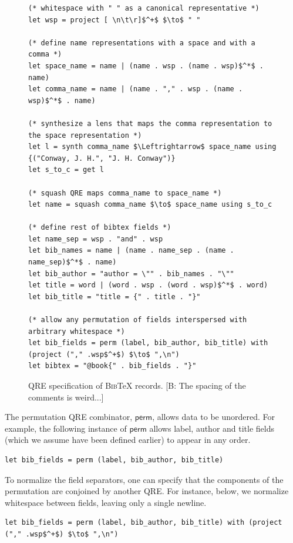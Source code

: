 \documentclass[acmsmall,review,anonymous]{acmart}
\newcommand{\FINISH}[3]{\ifdraft\textcolor{#1}{[#2: #3]}\fi}
\newcommand{\bcp}[1]{\FINISH{dkred}{B}{#1}}
\newcommand{\kw}[1]{\ensuremath{\mathsf{#1}}}
\newcommand{\bibtex}{\textsc{Bib}\TeX{}}
\begin{document}
\begin{figure}[t]
\begin{lstlisting}
(* whitespace with " " as a canonical representative *)
let wsp = project [ \n\t\r]$^+$ $\to$ " "

(* define name representations with a space and with a comma *)
let space_name = name | (name . wsp . (name . wsp)$^*$ . name)
let comma_name = name | (name . "," . wsp . (name . wsp)$^*$ . name)

(* synthesize a lens that maps the comma representation to the space representation *)
let l = synth comma_name $\Leftrightarrow$ space_name using {("Conway, J. H.", "J. H. Conway")}
let s_to_c = get l

(* squash QRE maps comma_name to space_name *)
let name = squash comma_name $\to$ space_name using s_to_c

(* define rest of bibtex fields *)
let name_sep = wsp . "and" . wsp
let bib_names = name | (name . name_sep . (name . name_sep)$^*$ . name)
let bib_author = "author = \"" . bib_names . "\""
let title = word | (word . wsp . (word . wsp)$^*$ . word)
let bib_title = "title = {" . title . "}"

(* allow any permutation of fields interspersed with arbitrary whitespace *)
let bib_fields = perm (label, bib_author, bib_title) with (project ("," .wsp$^+$) $\to$ ",\n")
let bibtex = "@book{" . bib_fields . "}"
\end{lstlisting}

\caption{QRE specification of \bibtex{} records. \bcp{The spacing of the
    comments is weird...}}
\label{fig:example-qre}
\end{figure}


The permutation QRE combinator, \kw{perm}, allows data to be unordered. For example,
the following instance of \kw{perm} allows label, author and title fields
(which we assume have been defined earlier) to appear in any order.
%
\begin{lstlisting}
let bib_fields = perm (label, bib_author, bib_title)
\end{lstlisting}
%
To normalize the field separators, one can specify that the
components of the permutation are conjoined by another QRE. For instance, below, we normalize whitespace
between fields, leaving only a single newline.
%
\begin{lstlisting}
let bib_fields = perm (label, bib_author, bib_title) with (project ("," .wsp$^+$) $\to$ ",\n")
\end{lstlisting}
\end{document}
